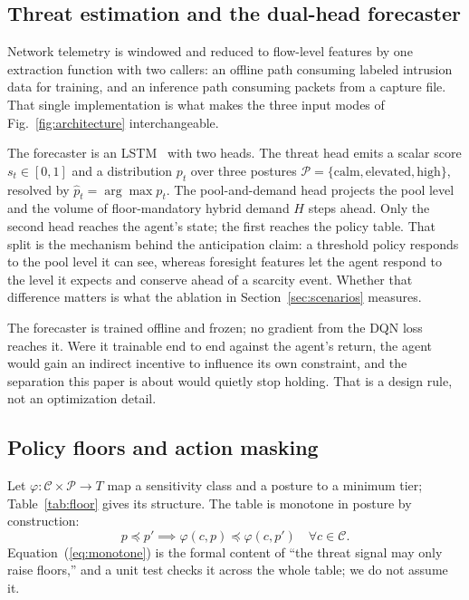 \documentclass[conference]{IEEEtran}
\begin{document}
\subsection{Threat estimation and the dual-head forecaster}

Network telemetry is windowed and reduced to flow-level
features by one extraction function with two callers: an offline
path consuming labeled intrusion data for training, and an
inference path consuming packets from a capture file. That
single implementation is what makes the three input modes of
Fig.~\ref{fig:architecture} interchangeable.

The forecaster is an LSTM~\cite{ref21} with two heads. The threat
head emits a scalar score $s_t \in [0,1]$ and a distribution $p_t$
over three postures $\mathcal{P} = \{\text{calm}, \text{elevated}, \text{high}\}$, resolved by
$\hat{p}_t = \arg\max p_t$. The pool-and-demand head projects the pool
level and the volume of floor-mandatory hybrid demand $H$
steps ahead. Only the second head reaches the agent's state;
the first reaches the policy table. That split is the mechanism
behind the anticipation claim: a threshold policy responds to
the pool level it can see, whereas foresight features let the
agent respond to the level it expects and conserve ahead of
a scarcity event. Whether that difference matters is what the
ablation in Section~\ref{sec:scenarios} measures.

The forecaster is trained offline and frozen; no gradient from
the DQN loss reaches it. Were it trainable end to end against
the agent's return, the agent would gain an indirect incentive
to influence its own constraint, and the separation this paper
is about would quietly stop holding. That is a design rule, not
an optimization detail.

\subsection{Policy floors and action masking}

Let $\varphi : \mathcal{C} \times \mathcal{P} \to T$ map a sensitivity class and a posture
to a minimum tier; Table~\ref{tab:floor} gives its structure. The table is
monotone in posture by construction:
\begin{equation}
p \preceq p' \implies \varphi(c,p) \preceq \varphi(c,p') \quad \forall c \in \mathcal{C}.
\label{eq:monotone}
\end{equation}
Equation~(\ref{eq:monotone}) is the formal content of ``the threat signal may
only raise floors,'' and a unit test checks it across the whole
table; we do not assume it.
\end{document}
